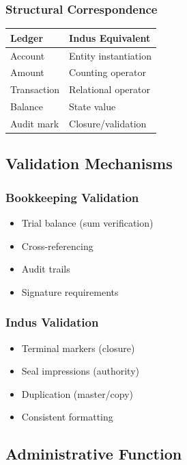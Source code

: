 \subsubsection{Structural Correspondence}
\begin{center}
\begin{tabular}{ll}
Ledger & Indus Equivalent \\
\hline
Account & Entity instantiation \\
Amount & Counting operator \\
Transaction & Relational operator \\
Balance & State value \\
Audit mark & Closure/validation \\
\end{tabular}
\end{center}

\subsection{Validation Mechanisms}

\subsubsection{Bookkeeping Validation}
\begin{itemize}
    \item Trial balance (sum verification)
    \item Cross-referencing
    \item Audit trails
    \item Signature requirements
\end{itemize}

\subsubsection{Indus Validation}
\begin{itemize}
    \item Terminal markers (closure)
    \item Seal impressions (authority)
    \item Duplication (master/copy)
    \item Consistent formatting
\end{itemize}

\subsection{Administrative Function}

